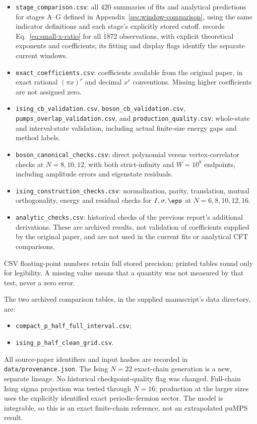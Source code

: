 \begin{itemize}
$N=144,160,176,192,208,224,240,256$.
\texttt{larger\_size\_quality.csv}: 336 state/interval diagnostics;
\texttt{larger\_size\_checks.csv}: the 70 endpoint checks at $N=256$
described in Appendix~\ref{sec:n256-sanity}.
\item \texttt{stage\_comparison.csv}: all 420 summaries of fits and analytical predictions for
stages A--G defined in Appendix~\ref{sec:window-comparison}, using the
same indicator definitions and each stage's explicitly stored cutoff.
 records Eq.~\eqref{eq:small-x-ratio}
for all 1872 observations, with explicit theoretical exponents and coefficients;
its fitting and display flags identify the separate current windows.
\item \texttt{exact\_coefficients.csv}: coefficients available from the
original paper, in exact rational $(\pi x)^r$ and decimal $x^r$ conventions.
Missing higher coefficients are not assigned zero.
\item \texttt{ising\_cb\_validation.csv},
\texttt{boson\_cb\_validation.csv},
\texttt{pumps\_overlap\_validation.csv}, and
\texttt{production\_quality.csv}: whole-state and interval-state validation,
including actual finite-size energy gaps and method labels.
\item \texttt{boson\_canonical\_checks.csv}: direct polynomial versus
vertex-correlator checks at $N=8,10,12$, with both strict-infinity and
$W=10^8$ endpoints, including amplitude errors and eigenstate residuals.
\item \texttt{ising\_construction\_checks.csv}: normalization, parity,
translation, mutual orthogonality, energy and residual checks for
$I,\sigma,\eps$ at $N=6,8,10,12,16$.
\item \texttt{analytic\_checks.csv}: historical checks of the previous
report's additional derivations. These are archived results, not validation
of coefficients supplied by the original paper, and are not used in the
current fits or analytical CFT comparisons.
\end{itemize}
CSV floating-point numbers retain full stored precision; printed tables
round only for legibility. A missing value means that a quantity was
not measured by that test, never a zero error.

The two archived comparison tables, in the supplied manuscript's data directory, are:
\begin{itemize}
\item \texttt{compact\_p\_half\_full\_interval.csv};
\item \texttt{ising\_p\_half\_clean\_grid.csv}.
\end{itemize}
All source-paper identifiers and input hashes are recorded in
\texttt{data/provenance.json}. The Ising $N=22$ exact-chain generation
is a new, separate lineage. No historical checkpoint-quality flag was
changed. Full-chain Ising sigma projection was tested through $N=16$;
production at the larger sizes uses the explicitly identified exact
periodic-fermion sector. The model is integrable, so this is an exact
finite-chain reference, not an extrapolated puMPS result.

